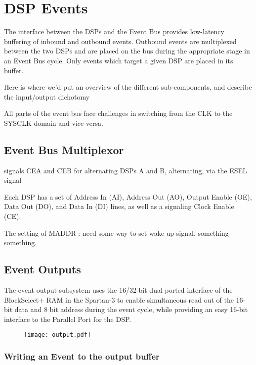 \section{DSP Events}

The interface between the DSPs and the Event Bus provides low-latency
buffering of inbound and outbound events. Outbound events are
multiplexed between the two DSPs and are placed on the bus during the
appropriate stage in an Event Bus cycle. Only events which target a
given DSP are placed in its buffer.

Here is where we'd put an overview of the different sub-components,
and describe the input/output dichotomy

All parts of the event bus face challenges in switching from the CLK
to the SYSCLK domain and vice-versa.

\subsection{Event Bus Multiplexor}
      
      signals CEA and CEB for alternating DSPs A and B, alternating, via the ESEL signal
      
      Each DSP has a set of Address In (AI), Address Out (AO), Output Enable (OE), Data Out (DO), and Data In (DI) lines, as well as a signaling Clock Enable (CE). 

      The setting of MADDR : need some way to set wake-up signal, something something. 

      

\subsection{Event Outputs}

The event output subsystem uses the 16/32 bit dual-ported interface of
the BlockSelect+ RAM in the Spartan-3 to enable simultaneous read out
of the 16-bit data and 8 bit address during the event cycle, while
providing an easy 16-bit interface to the Parallel Port for the DSP.
\begin{figure}
\texttt{[image: output.pdf]}
\end{figure}



\subsubsection{Writing an Event to the output buffer}


